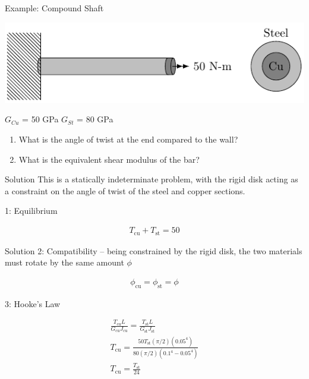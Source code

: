 \documentclass[10pt, svgnames]{beamer}
\begin{document}
\begin{frame}[label={sec:org39ab9f1}]{Example: Compound Shaft}
\begin{center}
\begin{center}
\includegraphics[width=.9\linewidth]{./pictures/compound-shaft.pdf}
\end{center}
\end{center}

\(G_{Cu}\) = 50 GPa \(G_{St}\) = 80 GPa

\begin{enumerate}
\item What is the angle of twist at the end compared to the wall?

\item What is the equivalent shear modulus of the bar?
\end{enumerate}
\end{frame}

\begin{frame}[label={sec:orgc7f6554}]{Solution}
This is a statically indeterminate problem, with the rigid disk
acting as a constraint on the angle of twist of the steel and copper
sections.

1: Equilibrium

\begin{align*}
    T_{\text{cu}} + T_{\text{st}} = 50
\end{align*}
\end{frame}

\begin{frame}[label={sec:orgd6a79c5}]{Solution}
2: Compatibility -- being constrained by the rigid disk, the two materials must rotate by the same amount \(\phi\)

\begin{align*}
  \phi_{\text{cu}} = \phi_{\text{st}} = \phi
\end{align*}

3: Hooke's Law

\begin{gather*}
    \frac{T_{\text{cu}} L}{G_{\text{cu}}J_{\text{cu}}} = \frac{T_{\text{st}}L}{G_{\text{st}} J_{\text{st}}} \\
    T_{\text{cu}} = \frac{50 T_{\text{st}} (\pi/2)(0.05^{4})}{80 (\pi/2)(0.1^{4} - 0.05^{4})} \\
    T_{\text{cu}} = \frac{T_{\text{st}}}{24}
\end{gather*}
\end{frame}
\end{document}
